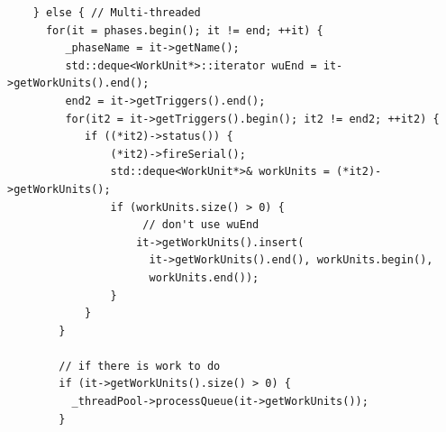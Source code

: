 \begin{lstlisting}
    } else { // Multi-threaded                                                                                 
      for(it = phases.begin(); it != end; ++it) {                                                             
         _phaseName = it->getName();                                                                          
         std::deque<WorkUnit*>::iterator wuEnd = it->getWorkUnits().end();                                        
         end2 = it->getTriggers().end();                                                                          
         for(it2 = it->getTriggers().begin(); it2 != end2; ++it2) {                                               
            if ((*it2)->status()) {                                                                               
                (*it2)->fireSerial();                                                                              
                std::deque<WorkUnit*>& workUnits = (*it2)->getWorkUnits();                                         
                if (workUnits.size() > 0) {                                                                        
                     // don't use wuEnd                                                                                  
                    it->getWorkUnits().insert(                                                                          
                      it->getWorkUnits().end(), workUnits.begin(),                                                     
                      workUnits.end());                                                                                
                }                                                                                                  
            }                                                                                                     
        }  
     
        // if there is work to do                                                                                
        if (it->getWorkUnits().size() > 0) {                                                                     
          _threadPool->processQueue(it->getWorkUnits());                                                        
        }                                                                                                        
                                                                                                              

\end{lstlisting}
